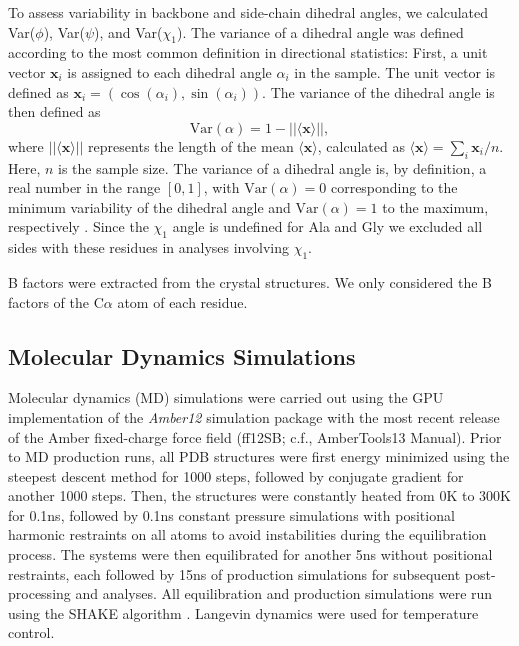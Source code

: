 \documentclass[12pt]{article}
\begin{document}
To assess variability in backbone and side-chain dihedral angles, we calculated Var($\phi$), Var($\psi$), and Var($\chi_1$). The variance of a dihedral angle was defined according to the most common definition in directional statistics:  
First, a unit vector $\mathbf{x}_i$ is assigned to each dihedral angle $\alpha_i$ in the sample. The unit vector is defined as $\mathbf{x}_i = ( \cos (\alpha_i), \sin (\alpha_i) )$.
The variance of the dihedral angle is then defined as
\begin{equation}
\text{Var}(\alpha) = 1 - ||\langle \mathbf{x}\rangle||,
\end{equation}
where $||\langle \mathbf{x}\rangle||$ represents the length of the mean $\langle \mathbf{x}\rangle$, calculated as $\langle \mathbf{x}\rangle=\sum_i \mathbf{x}_i/n$. Here, $n$ is the sample size. The variance of a dihedral angle is, by definition, a real number in the range $[0,1]$, with $\text{Var}(\alpha) = 0$ corresponding to the minimum variability of the dihedral angle and $\text{Var}(\alpha) = 1$ to the maximum, respectively \citep{Berens2009}. Since the $\chi_1$ angle is undefined for Ala and Gly we excluded all sides with these residues in analyses involving $\chi_1$.

B factors were extracted from the crystal structures. We only considered the B factors of the C$\alpha$ atom of each residue.


\subsection*{Molecular Dynamics Simulations}

Molecular dynamics (MD) simulations were carried out using the GPU implementation of the {\it Amber12} simulation package \citep{SalomonFerreretal2013} with the most recent release of the Amber fixed-charge force field (ff12SB; c.f., AmberTools13 Manual). Prior to MD production runs, all PDB structures were first energy minimized using the steepest descent method for 1000 steps, followed by conjugate gradient for another 1000 steps. Then, the structures were constantly heated from 0K to 300K for 0.1ns, followed by 0.1ns constant pressure simulations with positional harmonic restraints on all atoms to avoid instabilities during the equilibration process. The systems were then equilibrated for another 5ns without positional restraints, each followed by 15ns of production simulations for subsequent post-processing and analyses. All equilibration and production simulations were run using the SHAKE algorithm \citep{Ryckaert1977}. Langevin dynamics were used for temperature control.
\end{document}
